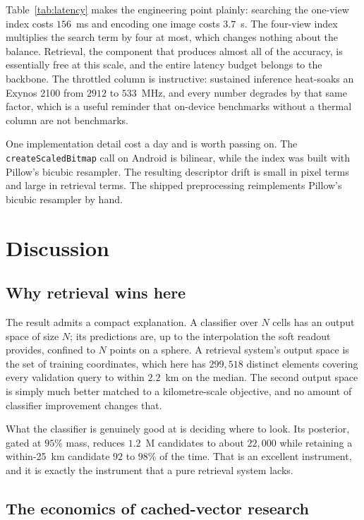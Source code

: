 \documentclass[11pt,a4paper]{article}
\begin{document}
Table~\ref{tab:latency} makes the engineering point plainly: searching the one-view index
costs $156$~ms and encoding one image costs $3.7$~s. The four-view index multiplies the
search term by four at most, which changes nothing about the balance. Retrieval, the
component that produces almost all of the accuracy, is essentially free at this scale, and
the entire latency budget belongs to the backbone. The throttled column is instructive: sustained inference heat-soaks
an Exynos 2100 from $2912$ to $533$~MHz, and every number degrades by that same factor, which
is a useful reminder that on-device benchmarks without a thermal column are not benchmarks.

One implementation detail cost a day and is worth passing on. The
\texttt{createScaledBitmap} call on Android is bilinear, while the index was built with
Pillow's bicubic resampler. The resulting descriptor drift is small in pixel terms and large in
retrieval terms. The shipped preprocessing reimplements Pillow's bicubic resampler by hand.

\section{Discussion}

\subsection{Why retrieval wins here}

The result admits a compact explanation. A classifier over $N$ cells has an output space of
size $N$; its predictions are, up to the interpolation the soft readout provides, confined to
$N$ points on a sphere. A retrieval system's output space is the set of training coordinates,
which here has $299{,}518$ distinct elements covering every validation query to within
$2.2$~km on the median. The second output space is simply much better matched to a
kilometre-scale objective, and no amount of classifier improvement changes that.

What the classifier is genuinely good at is deciding where to look. Its posterior, gated at
$95\%$ mass, reduces $1.2$~M candidates to about $22{,}000$ while retaining a within-25~km
candidate $92$ to $98\%$ of the time. That is an excellent instrument, and it is exactly the
instrument that a pure retrieval system lacks.

\subsection{The economics of cached-vector research}
\end{document}
